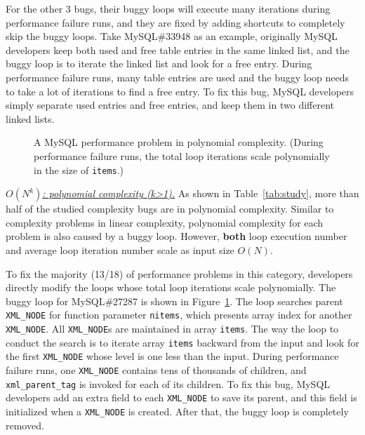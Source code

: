 For the other 3 bugs, their buggy loops will execute many iterations 
during performance failure runs,
and they are fixed by adding shortcuts to completely skip the buggy loops.
Take MySQL\#33948 as an example, 
originally MySQL developers keep both used and free table entries in the same linked list,
and the buggy loop is to iterate the linked list and look for a free entry.
During performance failure runs, many table entries are used and the buggy loop 
needs to take a lot of iterations to find a free entry. 
To fix this bug, MySQL developers simply separate used entries 
and free entries, and keep them in two different linked lists. 

\begin{figure}
\centering
{}
  \mbox{}
\caption{A MySQL performance problem in polynomial complexity. 
\footnotesize{(During performance failure runs, 
   the total loop iterations scale polynomially in the size of \texttt{items}.)}}
\vspace{-0.05in}
\label{fig:mysql27287}
\vspace{-0.05in}
\end{figure}

{\underline{\textit{$O(N^k)$: polynomial complexity (k>1).}}}
As shown in Table~\ref{tab:study}, 
more than half of the studied complexity bugs are in polynomial complexity. 
Similar to complexity problems in linear complexity,
polynomial complexity for each problem is also caused by a buggy loop.
However, {\bf both} loop execution number and average loop iteration number
scale as input size $O(N)$.

To fix the majority (13/18) of performance problems in this category, 
developers directly modify the loops whose total loop iterations scale polynomially.  
The buggy loop for MySQL\#27287 is shown in Figure~\ref{fig:mysql27287}.
The loop searches parent \texttt{XML\_NODE} for function parameter \texttt{nitems}, 
which presents array index for another \texttt{XML\_NODE}.
All \texttt{XML\_NODE}s are maintained in array \texttt{items}. 
The way the loop to conduct the search is to iterate array \texttt{items} 
backward from the input and look for the first \texttt{XML\_NODE} 
whose level is one less than the input.
During performance failure runs, 
one \texttt{XML\_NODE} contains tens of thousands of children, 
and \texttt{xml\_parent\_tag} is invoked for each of its children. 
To fix this bug, MySQL developers add an extra field to each 
\texttt{XML\_NODE} to save its parent, 
and this field is initialized when a \texttt{XML\_NODE} is created. 
After that, the buggy loop is completely removed. 



